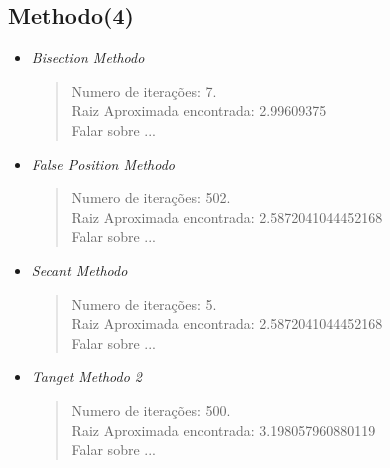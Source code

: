 \documentclass[12pt]{article}
\begin{document}
\subsection{Methodo(4)}
\begin{itemize}
    \item \textit{Bisection Methodo}\\
        \begin{verse}
          Numero de iterações: 7.\\
          Raiz Aproximada encontrada: 2.99609375\\
          Falar sobre ...
        \end{verse}
    \item \textit{False Position Methodo}
        \begin{verse}
          Numero de iterações: 502.\\
          Raiz Aproximada encontrada: 2.5872041044452168\\
          Falar sobre ...
        \end{verse}
    \item \textit{Secant Methodo}
        \begin{verse}
          Numero de iterações: 5.\\
          Raiz Aproximada encontrada: 2.5872041044452168\\
          Falar sobre ...
        \end{verse}
    \item \textit{Tanget Methodo 2}
        \begin{verse}
          Numero de iterações: 500.\\
          Raiz Aproximada encontrada: 3.198057960880119\\
          Falar sobre ...
        \end{verse}
\end{itemize}
\end{document}
